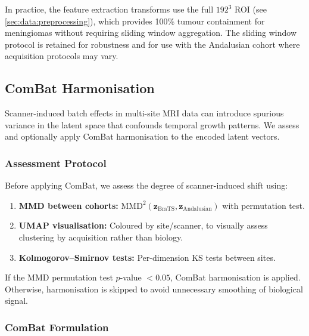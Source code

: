 In practice, the feature extraction transforms use the full $192^3$ ROI
(see \cref{sec:data:preprocessing}), which provides 100\% tumour containment
for meningiomas without requiring sliding window aggregation. The sliding
window protocol is retained for robustness and for use with the Andalusian
cohort where acquisition protocols may vary.

\subsection{ComBat Harmonisation}
\label{sec:enc:combat}

Scanner-induced batch effects in multi-site MRI data can introduce spurious
variance in the latent space that confounds temporal growth patterns. We
assess and optionally apply ComBat harmonisation
\cite{johnson2007adjusting,fortin2018harmonization} to the encoded latent
vectors.

\subsubsection{Assessment Protocol}

Before applying ComBat, we assess the degree of scanner-induced shift using:
\begin{enumerate}[leftmargin=*]
  \item \textbf{MMD between cohorts:} $\text{MMD}^2(\mathbf{z}_{\text{BraTS}},
    \mathbf{z}_{\text{Andalusian}})$ with permutation test.
  \item \textbf{UMAP visualisation:} Coloured by site/scanner, to visually
    assess clustering by acquisition rather than biology.
  \item \textbf{Kolmogorov--Smirnov tests:} Per-dimension KS tests between
    sites.
\end{enumerate}

If the MMD permutation test $p$-value $< 0.05$, ComBat harmonisation is
applied. Otherwise, harmonisation is skipped to avoid unnecessary smoothing
of biological signal.

\subsubsection{ComBat Formulation}

